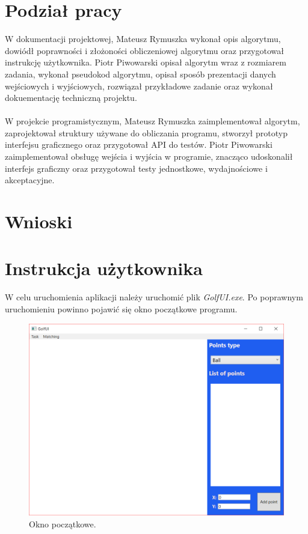 \documentclass[10pt,a4paper]{article}
\begin{document}
	\section{Podział pracy}
	
	W dokumentacji projektowej, Mateusz Rymuszka wykonał opis algorytmu, dowiódł poprawności i złożoności obliczeniowej algorytmu oraz przygotował instrukcję użytkownika. Piotr Piwowarski opisał algorytm wraz z rozmiarem zadania, wykonał pseudokod algorytmu, opisał sposób prezentacji danych wejściowych i wyjściowych, rozwiązał przykładowe zadanie oraz wykonał dokuementację techniczną projektu.\\~\\
	W projekcie programistycznym, Mateusz Rymuszka zaimplementował algorytm, zaprojektował struktury używane do obliczania programu, stworzył prototyp interfejsu graficznego oraz przygotował API do testów. Piotr Piwowarski zaimplementował obsługę wejścia i wyjścia w programie, znacząco udoskonalił interfejs graficzny oraz przygotował testy jednostkowe, wydajnościowe i akceptacyjne.
	
	\section{Wnioski}
	
	
	
	\pagebreak
	
	\section{Instrukcja użytkownika}
	
	W celu uruchomienia aplikacji należy uruchomić plik \textit{GolfUI.exe}. Po poprawnym uruchomieniu powinno pojawić się okno początkowe programu. 
	
	\begin{figure}[H]
		\centering	
 			\includegraphics[scale=0.6]{images/initial.png}
 			\caption{Okno początkowe.}
 		\label{fig:algorithm_diagram}
	\end{figure}	
	
\end{document}
